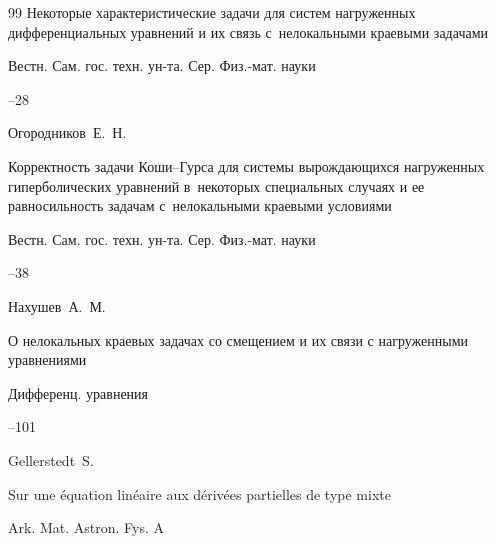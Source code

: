 \begin{thebibliography}{99}
\paper Некоторые характеристические задачи для систем нагруженных дифференциальных уравнений и их связь с~нелокальными краевыми задачами

\jour Вестн. Сам. гос. техн. ун-та. Сер. Физ.-мат. науки



--28






\by Огородников~Е.~Н.

\paper Корректность задачи Коши--Гурса для системы вырождающихся нагруженных гиперболических уравнений в~некоторых специальных случаях и ее равносильность задачам с~нелокальными краевыми условиями

\jour Вестн. Сам. гос. техн. ун-та. Сер. Физ.-мат. науки



--38






\by Нахушев~А.~М.

\paper О нелокальных краевых задачах со смещением и их связи с нагруженными уравнениями

\jour Дифференц. уравнения




--101






\by Gellerstedt~S.

\paper Sur une \'equation lin\'eaire aux d\'eriv\'ees partielles de type mixte

\jour Ark. Mat. Astron. Fys. A 




\end{thebibliography}
